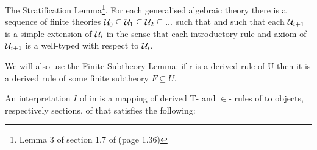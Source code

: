 \note The Stratification Lemma\footnote{Lemma 3 of section 1.7 of \cite{Cartmell78} (page 1.36)}. For each generalised algebraic theory \gatUw  there is a sequence of finite theories 
$\mathcal{U}_0 \subseteq \mathcal{U}_1 \subseteq \mathcal{U}_2 \subseteq ...$ such that  
and such that each $\mathcal{U}_{i+1}$ is a simple extension of $\mathcal{U}_i$ in the sense that each introductory rule and axiom of $\mathcal{U}_{i+1}$ is a well-typed  with respect to $\mathcal{U}_i$.

\note We will also use the Finite Subtheory Lemma: if r is a derived rule of U then 
it is a derived rule of some finite subtheory $F \subseteq U$. 

\note 
An interpretation $I$ of \gatUw in \catcw is a  mapping 
of derived T- and $\in$- rules of \gatUw to objects, respectively sections, of \gatUw that satisfies the following:
